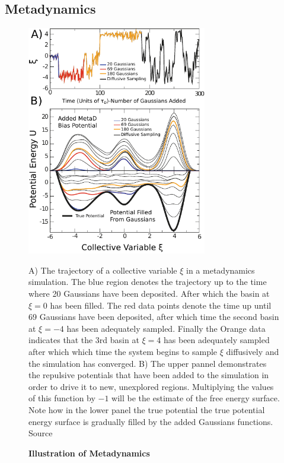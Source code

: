 \subsection{Metadynamics}
\begin{figure}
	\begin{center}
		\includegraphics[width=0.7\textwidth]{figures/METAD_demonstration.pdf}
	\end{center}
	\captionsetup{singlelinecheck = false, justification=raggedright}
	\caption[Illustration of Metadynamics] {\textbf{Illustration of Metadynamics}}{A) The trajectory of a collective variable $\xi$ in a  metadynamics simulation. The blue region denotes the trajectory up to the time where 20 Gaussians have been deposited. After which the basin at $\xi=0$ has been filled. The red data points denote the time up until 69 Gaussians have been deposited, after which time the second basin at $\xi=-4$ has been adequately sampled. Finally the Orange data indicates that the 3rd basin at $\xi=4$ has been adequately sampled after which which time the system begins to sample $\xi$ diffusively and the simulation has converged. B) The upper pannel demonstrates the repulsive potentials that have been added to the simulation in order to drive it to new, unexplored regions. Multiplying the values of this function by $-1$  will be the estimate of the free energy surface. Note how in the lower panel the true potential the true potential energy surface is gradually filled by the added Gaussians functions.  Source\cite{bussi2020}}
	\label{umbrella_sampling_illustration}
\end{figure}

